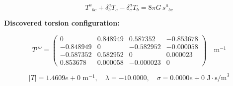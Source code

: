 
\begin{equation}
  T^a{}_{bc} + \delta^a_b T_c - \delta^a_c T_b = 8\pi G \, s^a{}_{bc}
\end{equation}

\textbf{Discovered torsion configuration:}

\begin{equation}
  T^{\mu\nu} = \begin{pmatrix}
    0 & 0.848949 & 0.587352 & -0.853678 \\
    -0.848949 & 0 & -0.582952 & -0.000058 \\
    -0.587352 & 0.582952 & 0 & 0.000023 \\
    0.853678 & 0.000058 & -0.000023 & 0
  \end{pmatrix} \quad \text{m}^{-1}
\end{equation}

\begin{equation}
  |T| = 1.4609e+0 \text{ m}^{-1}, \quad
  \lambda = -10.0000, \quad
  \sigma = 0.0000e+0 \text{ J}\cdot\text{s/m}^3
\end{equation}
